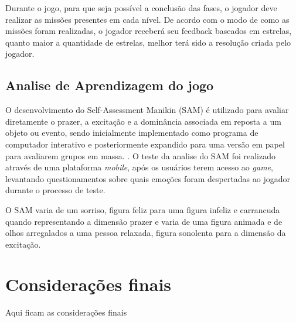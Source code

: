\documentclass[10pt, conference, compsocconf]{IEEEtran}
\begin{document}
Durante o jogo, para que seja possível a conclusão das fases, o jogador deve realizar as missões presentes em cada nível. De acordo com o modo de como as missões foram realizadas, o jogador receberá seu feedback baseados em estrelas, quanto maior a quantidade de estrelas, melhor terá sido a resolução criada pelo jogador.
	
	
	
\subsection{Analise de Aprendizagem do jogo}	
O desenvolvimento do Self-Assessment Manikin (SAM) é utilizado para avaliar diretamente o prazer, a excitação e a dominância associada em reposta a um objeto ou evento, sendo inicialmente implementado como programa de computador interativo e posteriormente expandido para uma versão em papel para avaliarem grupos em massa. \cite{bradley1994measuring}. O teste da analise do SAM foi realizado através de uma plataforma \textit{mobile}, após os usuários terem acesso ao \textit{game}, levantando questionamentos sobre quais emoções foram despertadas ao jogador durante o processo de teste.
 
O SAM varia de um sorriso, figura feliz para uma figura infeliz e carrancuda quando representando a dimensão prazer e varia de uma figura animada e de olhos arregalados a uma pessoa relaxada, figura sonolenta para a dimensão da excitação. 

\section{Considerações finais}
Aqui ficam as considerações finais  




\end{document}
